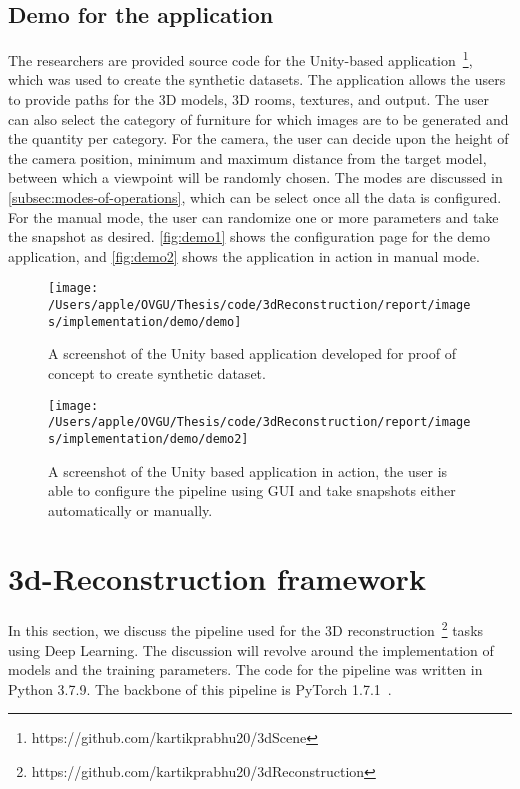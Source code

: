 \subsection{Demo for the application}\label{subsec:demo}

The researchers are provided source code for the Unity-based application~\footnote{https://github.com/kartikprabhu20/3dScene}, which was used to create the synthetic datasets.
The application allows the users to provide paths for the 3D models, 3D rooms, textures, and output.
The user can also select the category of furniture for which images are to be generated and the quantity per category.
For the camera, the user can decide upon the height of the camera position, minimum and maximum distance from the target model, between which a viewpoint will be randomly chosen.
The modes are discussed in \autoref{subsec:modes-of-operations}, which can be select once all the data is configured.
For the manual mode, the user can randomize one or more parameters and take the snapshot as desired.
\autoref{fig:demo1} shows the configuration page for the demo application, and \autoref{fig:demo2} shows the application in action in manual mode.

\begin{figure}
    \centering
    \texttt{[image: /Users/apple/OVGU/Thesis/code/3dReconstruction/report/images/implementation/demo/demo]}
    \caption{A screenshot of the Unity based application developed for proof of concept to create synthetic dataset.}
    \label{fig:demo1}
\end{figure}

\begin{figure}
    \centering
    \texttt{[image: /Users/apple/OVGU/Thesis/code/3dReconstruction/report/images/implementation/demo/demo2]}
    \caption{A screenshot of the Unity based application in action, the user is able to configure the pipeline using GUI and take snapshots either automatically or manually.}
    \label{fig:demo2}
\end{figure}

\section{3d-Reconstruction framework}\label{sec:3d-reconstruction-framework}

In this section, we discuss the pipeline used for the 3D reconstruction~\footnote{https://github.com/kartikprabhu20/3dReconstruction} tasks using Deep Learning.
The discussion will revolve around the implementation of models and the training parameters.
The code for the pipeline was written in Python 3.7.9.
The backbone of this pipeline is PyTorch 1.7.1~\cite{NEURIPS2019_9015}.

